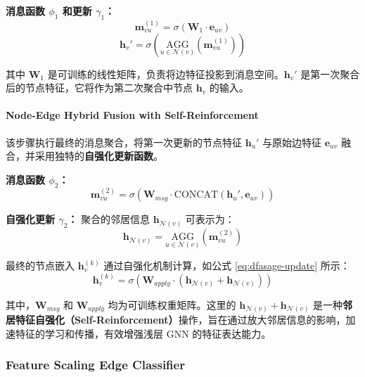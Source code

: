 \documentclass{article}
\begin{document}
\textbf{消息函数 $\phi_1$ 和更新 $\gamma_1$：}
$$
\mathbf{m}_{vu}^{(1)} = \sigma \left( \mathbf{W}_{1} \cdot \mathbf{e}_{uv} \right)
$$
\begin{equation}
\mathbf{h}_v' = \sigma \left( \underset{u \in \mathcal{N}(v)}{\text{AGG}} (\mathbf{m}_{vu}^{(1)}) \right)
\end{equation}

其中 $\mathbf{W}_{1}$ 是可训练的线性矩阵，负责将边特征投影到消息空间。$\mathbf{h}_v'$ 是第一次聚合后的节点特征，它将作为第二次聚合中节点 $\mathbf{h}_v$ 的输入。

\paragraph{Node-Edge Hybrid Fusion with Self-Reinforcement}

该步骤执行最终的消息聚合，将第一次更新的节点特征 $\mathbf{h}_u'$ 与原始边特征 $\mathbf{e}_{uv}$ 融合，并采用独特的\textbf{自强化更新函数}。

\textbf{消息函数 $\phi_2$：}
$$
\mathbf{m}_{vu}^{(2)} = \sigma \left( \mathbf{W}_{msg} \cdot \text{CONCAT}(\mathbf{h}_u', \mathbf{e}_{uv}) \right)
$$

\textbf{自强化更新 $\gamma_2$：}
聚合的邻居信息 $\mathbf{h}_{\mathcal{N}(v)}$ 可表示为：
$$
\mathbf{h}_{\mathcal{N}(v)} = \underset{u \in \mathcal{N}(v)}{\text{AGG}} (\mathbf{m}_{vu}^{(2)})
$$

最终的节点嵌入 $\mathbf{h}_v^{(k)}$ 通过自强化机制计算，如公式 \eqref{eq:dfasage-update} 所示：
\begin{equation}
\mathbf{h}_v^{(k)} = \sigma \left( \mathbf{W}_{apply} \cdot (\mathbf{h}_{\mathcal{N}(v)} + \mathbf{h}_{\mathcal{N}(v)}) \right)
\label{eq:dfasage-update}
\end{equation}

其中，$\mathbf{W}_{msg}$ 和 $\mathbf{W}_{apply}$ 均为可训练权重矩阵。这里的 $\mathbf{h}_{\mathcal{N}(v)} + \mathbf{h}_{\mathcal{N}(v)}$ 是一种\textbf{邻居特征自强化（Self-Reinforcement）}操作，旨在通过放大邻居信息的影响，加速特征的学习和传播，有效增强浅层 GNN 的特征表达能力。


\subsubsection{Feature Scaling Edge Classifier}
\end{document}
